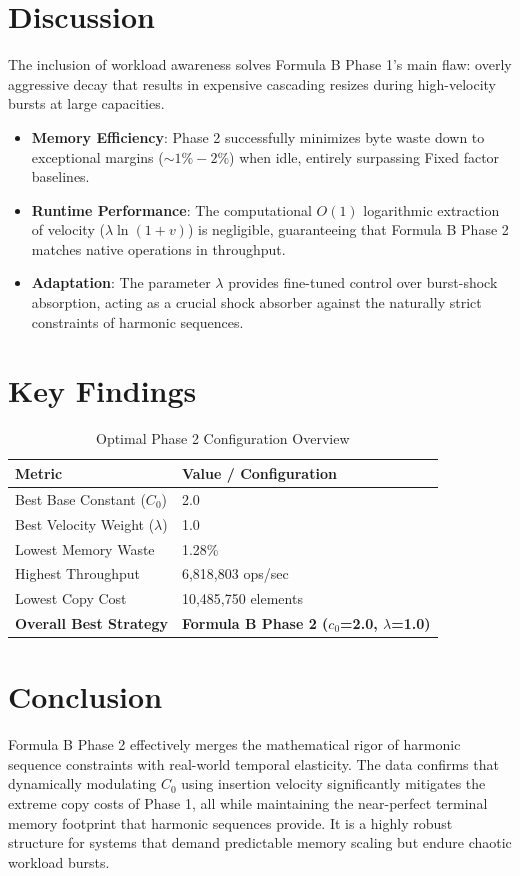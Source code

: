 \documentclass[11pt, a4paper]{article}
\begin{document}
\section{Discussion}
The inclusion of workload awareness solves Formula B Phase 1's main flaw: overly aggressive decay that results in expensive cascading resizes during high-velocity bursts at large capacities.
\begin{itemize}
    \item \textbf{Memory Efficiency}: Phase 2 successfully minimizes byte waste down to exceptional margins ($\sim 1\% - 2\%$) when idle, entirely surpassing Fixed factor baselines.
    \item \textbf{Runtime Performance}: The computational $O(1)$ logarithmic extraction of velocity ($\lambda \ln(1+v)$) is negligible, guaranteeing that Formula B Phase 2 matches native operations in throughput.
    \item \textbf{Adaptation}: The parameter $\lambda$ provides fine-tuned control over burst-shock absorption, acting as a crucial shock absorber against the naturally strict constraints of harmonic sequences.
\end{itemize}

\section{Key Findings}

\begin{table}[H]
\centering
\caption{Optimal Phase 2 Configuration Overview}
\begin{tabular}{ll}
\toprule
\textbf{Metric} & \textbf{Value / Configuration} \\
\midrule
Best Base Constant ($C_0$) & 2.0 \\
Best Velocity Weight ($\lambda$) & 1.0 \\
Lowest Memory Waste & 1.28\% \\
Highest Throughput & 6,818,803 ops/sec \\
Lowest Copy Cost & 10,485,750 elements \\
\textbf{Overall Best Strategy} & \textbf{Formula B Phase 2 ($c_0$=2.0, $\lambda$=1.0)} \\
\bottomrule
\end{tabular}
\end{table}

\section{Conclusion}
Formula B Phase 2 effectively merges the mathematical rigor of harmonic sequence constraints with real-world temporal elasticity. The data confirms that dynamically modulating $C_0$ using insertion velocity significantly mitigates the extreme copy costs of Phase 1, all while maintaining the near-perfect terminal memory footprint that harmonic sequences provide. It is a highly robust structure for systems that demand predictable memory scaling but endure chaotic workload bursts.
\end{document}
